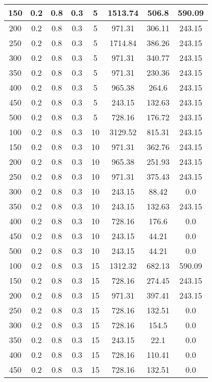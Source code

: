 \documentclass[a4paper, 12pt]{extreport}
\begin{document}
\begin{itemize}
\begin{longtable}{|c|c|c|c|c|c|c|c|}
			150 & 0.2 & 0.8 & 0.3 & 5 & 1513.74 & 506.8 & 590.09 \\\hline
			200 & 0.2 & 0.8 & 0.3 & 5 & 971.31 & 306.11 & 243.15 \\\hline
			250 & 0.2 & 0.8 & 0.3 & 5 & 1714.84 & 386.26 & 243.15 \\\hline
			300 & 0.2 & 0.8 & 0.3 & 5 & 971.31 & 340.77 & 243.15 \\\hline
			350 & 0.2 & 0.8 & 0.3 & 5 & 971.31 & 230.36 & 243.15 \\\hline
			400 & 0.2 & 0.8 & 0.3 & 5 & 965.38 & 264.6 & 243.15 \\\hline
			450 & 0.2 & 0.8 & 0.3 & 5 & 243.15 & 132.63 & 243.15 \\\hline
			500 & 0.2 & 0.8 & 0.3 & 5 & 728.16 & 176.72 & 243.15 \\\hline
			100 & 0.2 & 0.8 & 0.3 & 10 & 3129.52 & 815.31 & 243.15 \\\hline
			150 & 0.2 & 0.8 & 0.3 & 10 & 971.31 & 362.76 & 243.15 \\\hline
			200 & 0.2 & 0.8 & 0.3 & 10 & 965.38 & 251.93 & 243.15 \\\hline
			250 & 0.2 & 0.8 & 0.3 & 10 & 971.31 & 375.43 & 243.15 \\\hline
			300 & 0.2 & 0.8 & 0.3 & 10 & 243.15 & 88.42 & 0.0 \\\hline
			350 & 0.2 & 0.8 & 0.3 & 10 & 243.15 & 132.63 & 243.15 \\\hline
			400 & 0.2 & 0.8 & 0.3 & 10 & 728.16 & 176.6 & 0.0 \\\hline
			450 & 0.2 & 0.8 & 0.3 & 10 & 243.15 & 44.21 & 0.0 \\\hline
			500 & 0.2 & 0.8 & 0.3 & 10 & 243.15 & 44.21 & 0.0 \\\hline
			100 & 0.2 & 0.8 & 0.3 & 15 & 1312.32 & 682.13 & 590.09 \\\hline
			150 & 0.2 & 0.8 & 0.3 & 15 & 728.16 & 274.45 & 243.15 \\\hline
			200 & 0.2 & 0.8 & 0.3 & 15 & 971.31 & 397.41 & 243.15 \\\hline
			250 & 0.2 & 0.8 & 0.3 & 15 & 728.16 & 132.51 & 0.0 \\\hline
			300 & 0.2 & 0.8 & 0.3 & 15 & 728.16 & 154.5 & 0.0 \\\hline
			350 & 0.2 & 0.8 & 0.3 & 15 & 243.15 & 22.1 & 0.0 \\\hline
			400 & 0.2 & 0.8 & 0.3 & 15 & 728.16 & 110.41 & 0.0 \\\hline
			450 & 0.2 & 0.8 & 0.3 & 15 & 728.16 & 132.51 & 0.0 \\\hline

\end{longtable}
\end{itemize}
\end{document}
